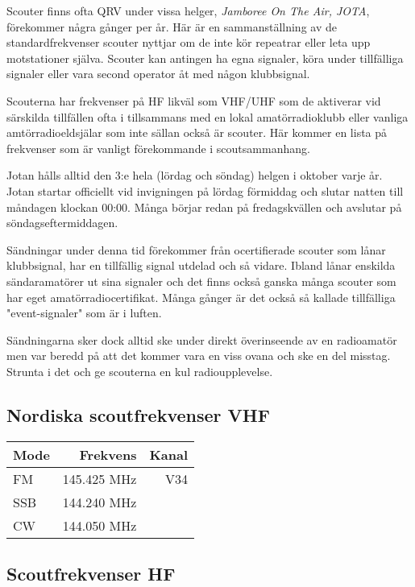 Scouter finns ofta QRV under vissa helger, \textit{Jamboree On The Air, JOTA},
förekommer några gånger per år. Här är en sammanställning av de
standardfrekvenser scouter nyttjar om de inte kör repeatrar eller leta upp
motstationer själva. Scouter kan antingen ha egna signaler, köra under
tillfälliga signaler eller vara second operator åt med någon klubbsignal.

Scouterna har frekvenser på HF likväl som VHF/UHF som de aktiverar vid
särskilda tillfällen ofta i tillsammans med en lokal amatörradioklubb eller
vanliga amtörradioeldsjälar som inte sällan också är scouter. Här kommer en
lista på frekvenser som är vanligt förekommande i scoutsammanhang.

Jotan hålls alltid den 3:e hela (lördag och söndag) helgen i oktober varje år.
Jotan startar officiellt vid invigningen på lördag förmiddag och slutar natten
till måndagen klockan 00:00. Många börjar redan på fredagskvällen och avslutar
på söndagseftermiddagen.

Sändningar under denna tid förekommer från ocertifierade scouter som lånar
klubbsignal, har en tillfällig signal utdelad och så vidare. Ibland lånar
enskilda sändaramatörer ut sina signaler och det finns också ganska många
scouter som har eget amatörradiocertifikat. Många gånger är det också så
kallade tillfälliga "event-signaler" som är i luften.

Sändningarna sker dock alltid ske under direkt överinseende av en radioamatör
men var beredd på att det kommer vara en viss ovana och ske en del misstag.
Strunta i det och ge scouterna en kul radioupplevelse.

\subsection{Nordiska scoutfrekvenser VHF}

\begin{center}
\begin{tabular}{lrr}
	\textbf{Mode} & \textbf{Frekvens} & \textbf{Kanal} \\ \hline
	FM            &      145.425  MHz &   V34 \\
	SSB           &      144.240  MHz &  \\
	CW            &      144.050  MHz &
\end{tabular}
\end{center}

\subsection{Scoutfrekvenser HF}

